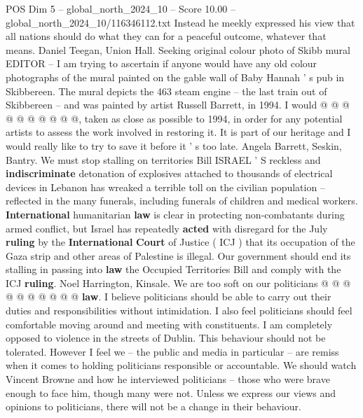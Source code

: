 \begin{textsample}{POS Dim 5 – global\_north\_2024\_10 – Score 10.00 – global\_north\_2024\_10/116346112.txt}
Instead he meekly expressed his view that all nations should do what they can for a peaceful outcome, whatever that means.
Daniel Teegan, Union Hall.
Seeking original colour photo of Skibb mural EDITOR -- I am trying to ascertain if anyone would have any old colour photographs of the mural painted on the gable wall of Baby Hannah ' s pub in Skibbereen.
The mural depicts the 463 steam engine -- the last train out of Skibbereen -- and was painted by artist Russell Barrett, in 1994.
I would @ @ @ @ @ @ @ @ @ @, taken as close as possible to 1994, in order for any potential artists to assess the work involved in restoring it.
It is part of our heritage and I would really like to try to save it before it ' s too late.
Angela Barrett, Seskin, Bantry.
We must stop stalling on territories Bill ISRAEL ' S reckless and \textbf{indiscriminate} detonation of explosives attached to thousands of electrical devices in Lebanon has wreaked a terrible toll on the civilian population -- reflected in the many funerals, including funerals of children and medical workers. \textbf{International} humanitarian \textbf{law} is clear in protecting non-combatants during armed conflict, but Israel has repeatedly \textbf{acted} with disregard for the July \textbf{ruling} by the \textbf{International} \textbf{Court} of Justice ( ICJ ) that its occupation of the Gaza strip and other areas of Palestine is illegal.
Our government should end its stalling in passing into \textbf{law} the Occupied Territories Bill and comply with the ICJ \textbf{ruling}.
Noel Harrington, Kinsale.
We are too soft on our politicians @ @ @ @ @ @ @ @ @ @ \textbf{law}.
I believe politicians should be able to carry out their duties and responsibilities without intimidation.
I also feel politicians should feel comfortable moving around and meeting with constituents.
I am completely opposed to violence in the streets of Dublin.
This behaviour should not be tolerated.
However I feel we -- the public and media in particular -- are remiss when it comes to holding politicians responsible or accountable.
We should watch Vincent Browne and how he interviewed politicians -- those who were brave enough to face him, though many were not.
Unless we express our views and opinions to politicians, there will not be a change in their behaviour.

\end{textsample}
